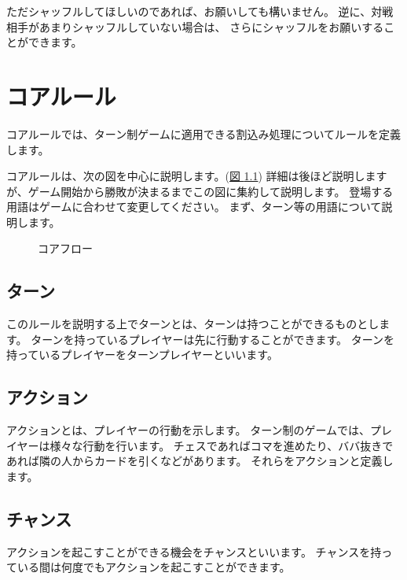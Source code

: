 \documentclass[letterpaper,10pt,dvipdfmx]{sphinxmanual}
\begin{document}
ただシャッフルしてほしいのであれば、お願いしても構いません。
逆に、対戦相手があまりシャッフルしていない場合は、
さらにシャッフルをお願いすることができます。


\chapter{コアルール}
\label{\detokenize{core/core:id1}}\label{\detokenize{core/core::doc}}
コアルールでは、ターン制ゲームに適用できる割込み処理についてルールを定義します。

コアルールは、次の図を中心に説明します。(\hyperref[\detokenize{core/core:coreflow-1}]{図 \ref{\detokenize{core/core:coreflow-1}}})
詳細は後ほど説明しますが、ゲーム開始から勝敗が決まるまでこの図に集約して説明します。
登場する用語はゲームに合わせて変更してください。
まず、ターン等の用語について説明します。

\begin{figure}[htbp]
\centering
\capstart

\noindent{}
\caption{コアフロー}\label{\detokenize{core/core:id16}}\label{\detokenize{core/core:coreflow-1}}\end{figure}


\section{ターン}
\label{\detokenize{core/core:id2}}
このルールを説明する上でターンとは、ターンは持つことができるものとします。
ターンを持っているプレイヤーは先に行動することができます。
ターンを持っているプレイヤーをターンプレイヤーといいます。


\section{アクション}
\label{\detokenize{core/core:id3}}
アクションとは、プレイヤーの行動を示します。
ターン制のゲームでは、プレイヤーは様々な行動を行います。
チェスであればコマを進めたり、ババ抜きであれば隣の人からカードを引くなどがあります。
それらをアクションと定義します。


\section{チャンス}
\label{\detokenize{core/core:id4}}
アクションを起こすことができる機会をチャンスといいます。
チャンスを持っている間は何度でもアクションを起こすことができます。
\end{document}
